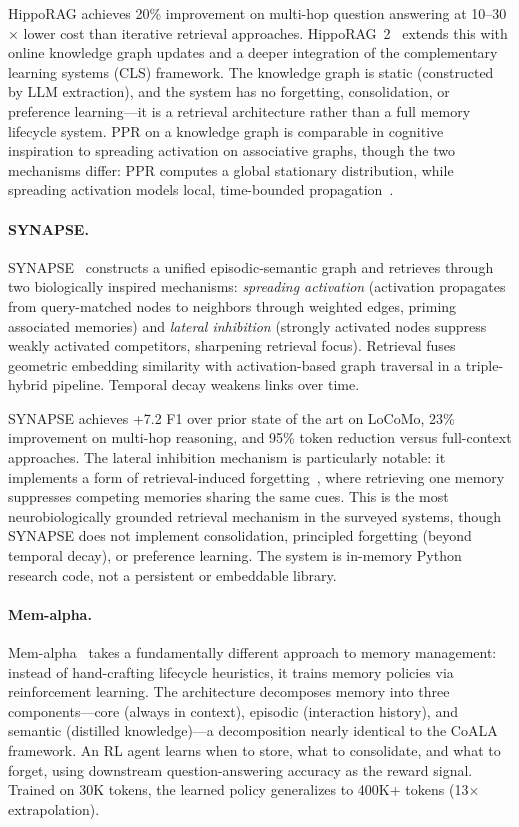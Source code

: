 HippoRAG achieves 20\% improvement on multi-hop question answering at
10--30$\times$ lower cost than iterative retrieval
approaches. HippoRAG~2~\cite{gutierrez2025rag2memory} extends this
with online knowledge graph updates and a deeper integration of the
complementary learning systems (CLS) framework. The knowledge graph
is static (constructed by LLM extraction), and the system has no
forgetting, consolidation, or preference learning---it is a retrieval
architecture rather than a full memory lifecycle system. PPR on a
knowledge graph is comparable in cognitive inspiration to spreading
activation on associative graphs, though the two mechanisms differ:
PPR computes a global stationary distribution, while spreading
activation models local, time-bounded propagation~\cite{collins1975}.

\paragraph{SYNAPSE.}
SYNAPSE~\cite{jiang2026synapse} constructs a unified episodic-semantic
graph and retrieves through two biologically inspired mechanisms:
\emph{spreading activation} (activation propagates from query-matched
nodes to neighbors through weighted edges, priming associated
memories) and \emph{lateral inhibition} (strongly activated nodes
suppress weakly activated competitors, sharpening retrieval focus).
Retrieval fuses geometric embedding similarity with activation-based
graph traversal in a triple-hybrid pipeline. Temporal decay weakens
links over time.

SYNAPSE achieves +7.2 F1 over prior state of the art on LoCoMo, 23\%
improvement on multi-hop reasoning, and 95\% token reduction versus
full-context approaches. The lateral inhibition mechanism is
particularly notable: it implements a form of retrieval-induced
forgetting~\cite{anderson1994}, where retrieving one memory
suppresses competing memories sharing the same cues. This is the most
neurobiologically grounded retrieval mechanism in the surveyed
systems, though SYNAPSE does not implement consolidation, principled
forgetting (beyond temporal decay), or preference learning. The
system is in-memory Python research code, not a persistent or
embeddable library.

\paragraph{Mem-alpha.}
Mem-alpha~\cite{wang2025memalpha} takes a fundamentally different
approach to memory management: instead of hand-crafting lifecycle
heuristics, it trains memory policies via reinforcement learning.
The architecture decomposes memory into three components---core
(always in context), episodic (interaction history), and semantic
(distilled knowledge)---a decomposition nearly identical to the CoALA
framework. An RL agent learns when to store, what to consolidate,
and what to forget, using downstream question-answering accuracy as
the reward signal. Trained on 30K tokens, the learned policy
generalizes to 400K+ tokens (13$\times$ extrapolation).

